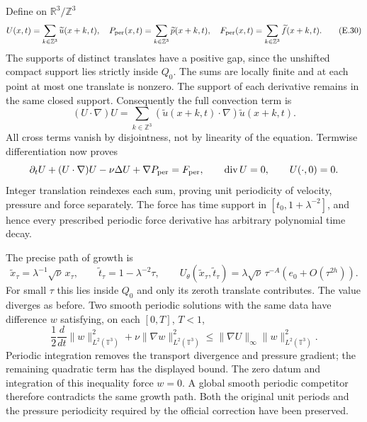 \documentclass[10pt,a4paper]{article}
\begin{document}
Define on $\mathbb R^3/\mathbb Z^3$
\[
 U(x,t)=\sum_{k\in\mathbb Z^3}\widetilde u(x+k,t),\quad
 P_{\rm per}(x,t)=\sum_{k\in\mathbb Z^3}\widetilde p(x+k,t),\quad
 F_{\rm per}(x,t)=\sum_{k\in\mathbb Z^3}\widetilde f(x+k,t).
 \tag{E.30}
\]
The supports of distinct translates have a positive gap, since
the unshifted compact support lies strictly inside $Q_0$.
The sums are locally finite and at each point at most one
translate is nonzero. The support of each derivative remains in
the same closed support. Consequently the full convection term is
\[
 (U\cdot\nabla)U
       =\sum_{k\in\mathbb Z^3}
             (\widetilde u(x+k,t)\cdot\nabla)\widetilde u(x+k,t).
\]
All cross terms vanish by disjointness, not by linearity of the
equation. Termwise differentiation now proves
\[
 \partial_tU+(U\cdot\nabla)U-\nu\Delta U+\nabla P_{\rm per}
        =F_{\rm per},\qquad
 \operatorname{div}U=0,\qquad U(\cdot,0)=0.
\]
Integer translation reindexes each sum, proving unit periodicity of
velocity, pressure and force separately. The force has time support
in $[t_0,1+\lambda^{-2}]$, and hence every prescribed periodic
force derivative has arbitrary polynomial time decay.

The precise path of growth is
\[
 \widetilde x_\tau=\lambda^{-1}\sqrt\nu\,x_\tau,\qquad
 \widetilde t_\tau=1-\lambda^{-2}\tau,\qquad
 U_\theta(\widetilde x_\tau,\widetilde t_\tau)
 =\lambda\sqrt\nu\,\tau^{-A}(e_0+O(\tau^{2h})).
\]
For small $\tau$ this lies inside $Q_0$ and only its zeroth
translate contributes. The value diverges as before.
Two smooth periodic solutions with the same data have difference
$w$ satisfying, on each $[0,T]$, $T<1$,
\[
 \frac12\frac{d}{dt}\|w\|_{L^2(\mathbb T^3)}^2
       +\nu\|\nabla w\|_{L^2(\mathbb T^3)}^2
 \le\|\nabla U\|_\infty\|w\|_{L^2(\mathbb T^3)}^2.
\]
Periodic integration removes the transport divergence and pressure
gradient; the remaining quadratic term has the displayed bound.
The zero datum and integration of this inequality force $w=0$.
A global smooth periodic competitor therefore contradicts the same
growth path. Both the original unit periods and the pressure
periodicity required by the official correction have been preserved.
\end{document}
